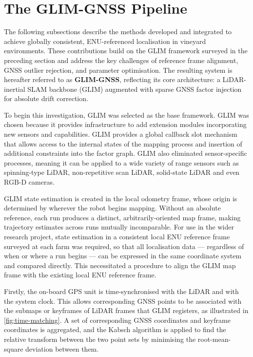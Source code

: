 \section{The GLIM-GNSS Pipeline}
\label{sec:slam-methodology}

The following subsections describe the methods developed and integrated to achieve globally consistent, ENU-referenced localisation in vineyard environments. These contributions build on the GLIM framework surveyed in the preceding section and address the key challenges of reference frame alignment, GNSS outlier rejection, and parameter optimisation. The resulting system is hereafter referred to as \textbf{GLIM-GNSS}, reflecting its core architecture: a LiDAR-inertial SLAM backbone (GLIM) augmented with sparse GNSS factor injection for absolute drift correction.

To begin this investigation, GLIM \cite{koideGLIM3DRangeInertial2024} was selected as the base framework. GLIM was chosen because it provides infrastructure to add extension modules incorporating new sensors and capabilities. GLIM provides a global callback slot mechanism that allows access to the internal states of the mapping process and insertion of additional constraints into the factor graph. GLIM also eliminated sensor-specific processes, meaning it can be applied to a wide variety of range sensors such as spinning-type LiDAR, non-repetitive scan LiDAR, solid-state LiDAR and even RGB-D cameras.

GLIM state estimation is created in the local odometry frame, whose origin is determined by wherever the robot begins mapping. Without an absolute reference, each run produces a distinct, arbitrarily-oriented map frame, making trajectory estimates across runs mutually incomparable. For use in the wider research project, state estimation in a consistent local ENU reference frame surveyed at each farm was required, so that all localisation data — regardless of when or where a run begins — can be expressed in the same coordinate system and compared directly. This necessitated a procedure to align the GLIM map frame with the existing local ENU reference frame.

Firstly, the on-board GPS unit is time-synchronised with the LiDAR and with the system clock. This allows corresponding GNSS points to be associated with the submaps or keyframes of LiDAR frames that GLIM registers, as illustrated in \cref{fig:time-matching}. A set of corresponding GNSS coordinates and keyframe coordinates is aggregated, and the Kabsch algorithm \cite{kabschSolutionBestRotation1976} is applied to find the relative transform between the two point sets by minimising the root-mean-square deviation between them.

